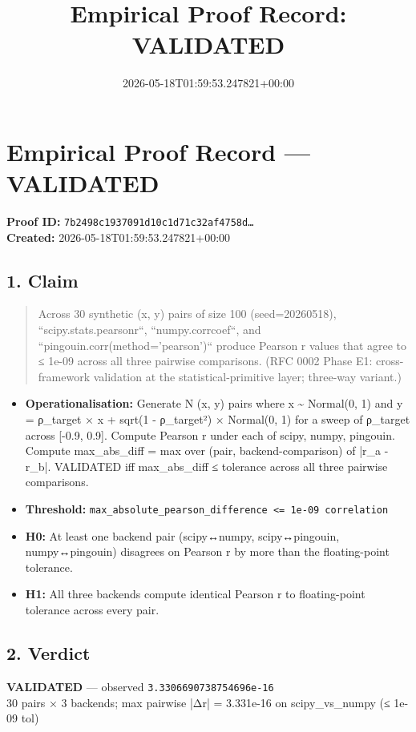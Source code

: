 \documentclass{article}
\title{Empirical Proof Record: VALIDATED}
\date{2026-05-18T01:59:53.247821+00:00}
\begin{document}
\maketitle
\section*{Empirical Proof Record --- \textcolor{validated}{\textbf{VALIDATED}}}
\textbf{Proof ID:} \texttt{7b2498c1937091d10c1d71c32af4758d\dots}\\
\textbf{Created:} 2026-05-18T01:59:53.247821+00:00
\subsection*{1. Claim}
\begin{quote}Across 30 synthetic (x, y) pairs of size 100 (seed=20260518), ``scipy.stats.pearsonr``, ``numpy.corrcoef``, and ``pingouin.corr(method='pearson')`` produce Pearson r values that agree to ≤ 1e-09 across all three pairwise comparisons. (RFC 0002 Phase E1: cross-framework validation at the statistical-primitive layer; three-way variant.)\end{quote}
\begin{itemize}
\item \textbf{Operationalisation:} Generate N (x, y) pairs where x \textasciitilde{} Normal(0, 1) and y = ρ\_target × x + sqrt(1 - ρ\_target²) × Normal(0, 1) for a sweep of ρ\_target across [-0.9, 0.9]. Compute Pearson r under each of scipy, numpy, pingouin. Compute max\_abs\_diff = max over (pair, backend-comparison) of |r\_a - r\_b|. VALIDATED iff max\_abs\_diff ≤ tolerance across all three pairwise comparisons.
\item \textbf{Threshold:} \texttt{max\_absolute\_pearson\_difference <= 1e-09 correlation}
\item \textbf{H0:} At least one backend pair (scipy↔numpy, scipy↔pingouin, numpy↔pingouin) disagrees on Pearson r by more than the floating-point tolerance.
\item \textbf{H1:} All three backends compute identical Pearson r to floating-point tolerance across every pair.
\end{itemize}
\subsection*{2. Verdict}
\textcolor{validated}{\textbf{VALIDATED}} --- observed \texttt{3.3306690738754696e-16}\\
30 pairs × 3 backends; max pairwise |Δr| = 3.331e-16 on scipy\_vs\_numpy (≤ 1e-09 tol)
\end{document}
